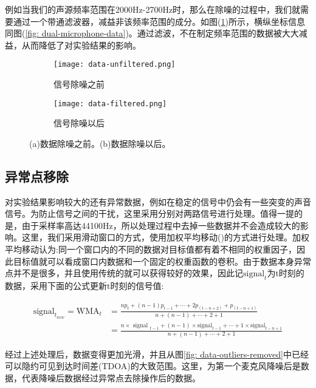 \documentclass[winfonts]{njuthesis}
\begin{document}
			例如当我们的声源频率范围在2000Hz-2700Hz时，那么在除噪的过程中，我们就需要通过一个带通滤波器，减益非该频率范围的成分。如图(\ref{fig: filter-data})所示，横纵坐标信息同图(\ref{fig: dual-microphone-data})。通过滤波，不在制定频率范围的数据被大大减益，从而降低了对实验结果的影响。
			
			\begin{figure}[ht!]
				\centering
				\begin{subfigure}{.45\textwidth}
					\centering
					\texttt{[image: data-unfiltered.png]}
					\caption{信号除噪之前}
				\end{subfigure}
				\begin{subfigure}{.45\textwidth}
					\centering
					\texttt{[image: data-filtered.png]}
					\caption{信号除噪以后}
				\end{subfigure}
				\caption{(a)数据除噪之前。(b)数据除噪以后。}
				\label{fig: filter-data}
			\end{figure}
					
		\subsection{异常点移除}
		
			对实验结果影响较大的还有异常数据，例如在稳定的信号中仍会有一些突变的声音信号。为防止信号之间的干扰，这里采用分别对两路信号进行处理。值得一提的是，由于采样率高达44100Hz，所以处理过程中去掉一些数据并不会造成较大的影响。这里，我们采用滑动窗口的方式，使用加权平均移动(\cite{Moving_average})的方式进行处理。加权平均移动认为:同一个窗口内的不同的数据对目标值都有着不相同的权重因子，因此目标值就可以看成窗口内数据和一个固定的权重函数的卷积。由于数据本身异常点并不是很多，并且使用传统的就可以获得较好的效果，因此记$\text{signal}_t$为t时刻的数据，采用下面的公式更新t时刻的信号值:
			
			\begin{equation}
			\begin{aligned}
				\text{signal}_{t_{new}} = \text{WMA}_{t}&=\frac{n p_{t}+(n-1) p_{t-1}+\cdots+2 p_{(t-n+2)}+p_{(t-n+1)}}{n+(n-1)+\cdots+2+1}\\
											  &=\frac{n \times \text { signal }_{t-1}+(n-1) \times \text {signal}_{t-1}+\cdots+1 \times \text {signal}_{t-n+1}}{n+(n-1)+\cdots+2+1}								 
			\end{aligned}
			\end{equation}
			
			经过上述处理后，数据变得更加光滑，并且从图\ref{fig: data-outliers-removed}中已经可以隐约可见到达时间差(TDOA)的大致范围。这里，为第一个麦克风降噪后是数据，代表降噪后数据经过异常点去除操作后的数据。
			
\end{document}
